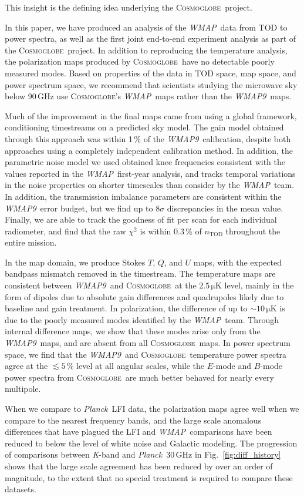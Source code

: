 \documentclass[twocolumn]{../../common/aa}
\def\WMAP{\emph{WMAP}}
\def\WMAPnine{\emph{WMAP9}}
\def\planck{\emph{Planck}}
\def\Planck{\emph{Planck}}
\newcommand{\cosmoglobe}{\textsc{Cosmoglobe}}
\newcommand{\K}[0]{\textit K}
\begin{document}
This insight is the defining idea underlying the \cosmoglobe\ project. 

In this paper, we have produced an analysis of the \WMAP\ data from TOD to power spectra, as well as the first joint end-to-end experiment analysis as part of the \cosmoglobe\ project. In addition to reproducing the temperature analysis, the polarization maps produced by \cosmoglobe\ have no detectable poorly measured modes. Based on properties of the data in TOD space, map space, and power spectrum space, we recommend that scientists studying the microwave sky below 90\,GHz use \cosmoglobe's \WMAP\ maps rather than the \WMAPnine\ maps.


Much of the improvement in the final maps came from using a global framework, conditioning timestreams on a predicted sky model. The gain model obtained through this approach was within 1\,\% of the \WMAPnine\ calibration, despite both approaches using a completely independent calibration method. In addition, the parametric noise model we used obtained knee frequencies consistent with the values reported in the \WMAP\ first-year analysis, and tracks temporal variations in the noise properties on shorter timescales than consider by the \WMAP\ team. 
In addition, the transmission imbalance parameters are consistent within the \WMAPnine\ error budget, but we find up to $8\sigma$ discrepancies in the mean value.
Finally, we are able to track the goodness of fit per scan for each individual radiometer, and find that the raw $\chi^2$ is within 0.3\,\% of $n_\mathrm{TOD}$ throughout the entire mission.


In the map domain, we produce Stokes $T$, $Q$, and $U$ maps, with the expected bandpass mismatch removed in the timestream. The temperature maps are consistent between \WMAPnine\ and \cosmoglobe\ at the $2.5\,\mathrm{\mu K}$ level, mainly in the form of dipoles due to absolute gain differences and quadrupoles likely due to baseline and gain treatment. In polarization, the difference of up to $\sim10\,\mathrm{\mu K}$ is due to the poorly measured modes identified by the \WMAP\ team. Through internal difference maps, we show that these modes arise only from the \WMAPnine\ maps, and are absent from all \cosmoglobe\ maps.
In power spectrum space, we find that the \WMAPnine\ and \cosmoglobe\ temperature power spectra agree at the $\lesssim5\,\%$ level at all angular scales, while the $E$-mode and $B$-mode power spectra from \cosmoglobe\ are much better behaved for nearly every multipole.

When we compare to \Planck\ LFI data, the polarization maps agree well when we compare to the nearest frequency bands, and the large scale anomalous differences that have plagued the LFI and \WMAP\ comparisons have been reduced to below the level of white noise and Galactic modeling. The progression of comparisons between \K-band and \planck\ 30\,GHz in Fig.~\ref{fig:diff_history} shows that the large scale agreement has been reduced by over an order of magnitude, to the extent that no special treatment is required to compare these datasets.
\end{document}
